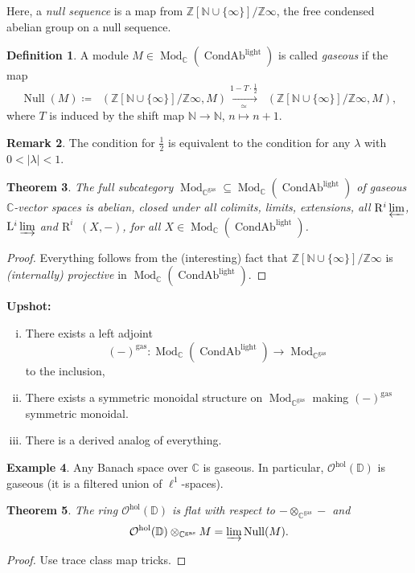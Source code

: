 \documentclass[draft]{amsart}
\newcommand{\NN}{\mathbb{N}}
\newcommand{\ZZ}{\mathbb{Z}}
\newcommand{\DD}{\mathbb{D}}
\newcommand{\CC}{\mathbb{C}}
\newcommand{\R}{\mathrm{R}}
\renewcommand{\L}{\mathrm{L}}
\renewcommand{\O}{\mathcal{O}}
\newcommand{\ul}[1]{\underline{#1}}
\newcommand{\blank}{-} %
\DeclareMathOperator{\Null}{Null}
\DeclareMathOperator{\CondAb}{CondAb}
\DeclareMathOperator{\iHom}{\ul{Hom}}
\DeclareMathOperator{\Mod}{Mod}
\newtheorem{thm}{Theorem}[section]
\theoremstyle{definition}
\newtheorem{defn}[thm]{Definition}
\newtheorem{rem}[thm]{Remark}
\newtheorem{ex}[thm]{Example}
\begin{document}
Here, a \emph{null sequence} is a map from $\ZZ[\NN\cup \{\infty\}]/\ZZ\infty$, the free condensed abelian group on a null sequence.

\begin{defn}
A module $M\in \Mod_{\CC}(\CondAb^{\mathrm{light}})$ is called \emph{gaseous} if the map
\[
\Null(M)\coloneqq \iHom(\ZZ[\NN\cup\{\infty\}]/\ZZ\infty, M) \xrightarrow[\simeq]{1-T\cdot \frac12} \iHom(\ZZ[\NN\cup\{\infty\}]/\ZZ\infty, M),
\]
where $T$ is induced by the shift map $\NN\to \NN$, $n\mapsto n+1$.
\end{defn}

\begin{rem}
The condition for $\frac12$ is equivalent to the condition for any $\lambda$ with $0< \lvert\lambda\rvert < 1$.
\end{rem}

\begin{thm}
The full subcategory $\Mod_{\CC^{\mathrm{gas}}} \subseteq \Mod_{\CC}(\CondAb^{\mathrm{light}})$ of gaseous $\CC$-vector spaces is abelian, closed under all colimits, limits, extensions, all $\R^i\varprojlim$, $\L^i\varinjlim$ and $\R^i\iHom(X,\blank)$, for all $X\in \Mod_{\CC}(\CondAb^{\mathrm{light}})$.
\end{thm}
\begin{proof}
Everything follows from the (interesting) fact that $\ZZ[\NN\cup\{\infty\}]/\ZZ\infty$ is \emph{(internally) projective} in $\Mod_{\CC}(\CondAb^{\mathrm{light}})$.
\end{proof}

\textbf{Upshot:} 
\begin{enumerate}[(i)]
\item There exists a left adjoint 
\[
(\blank)^{\mathrm{gas}}\colon \Mod_{\CC}(\CondAb^{\mathrm{light}}) \to \Mod_{\CC^{\mathrm{gas}}}
\]
to the inclusion,
\item There exists a symmetric monoidal structure on $\Mod_{\CC^{\mathrm{gas}}}$ making $(\blank)^{\mathrm{gas}}$ symmetric monoidal.

\item There is a derived analog of everything.
\end{enumerate}

\begin{ex}
Any Banach space over $\CC$ is gaseous. In particular, $\O^{\mathrm{hol}}(\DD)$ is gaseous (it is a filtered union of $\ell^1$-spaces).
\end{ex}

\begin{thm}
The ring $\O^{\mathrm{hol}}(\DD)$ is flat with respect to $\blank\otimes_{\CC^{\mathrm{gas}}}\blank$ and
\[
\O^{\mathrm{hol}}(\DD) \otimes_{\CC^{\mathrm{gas}}} M = \varinjlim \Null(M).
\]
\end{thm}
\begin{proof}
Use trace class map tricks.
\end{proof}
\end{document}
